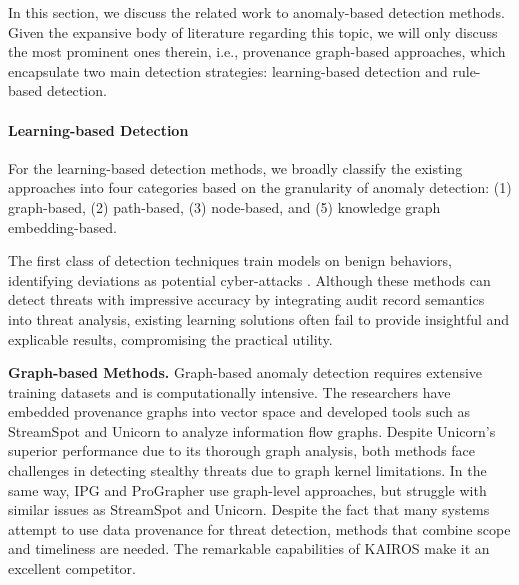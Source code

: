 

In this section, we discuss the related work to anomaly-based detection methods. Given the expansive body of literature regarding this topic, we will only discuss the most prominent ones therein, i.e., provenance graph-based approaches, which encapsulate two main detection strategies: learning-based detection and rule-based detection.


\paragraph{Learning-based Detection}
For the learning-based detection methods, we broadly classify the existing approaches into four categories based on the granularity of anomaly detection: (1) graph-based, (2) path-based, (3) node-based, and (5) knowledge graph embedding-based.

The first class of detection techniques train models on benign behaviors, identifying deviations as potential cyber-attacks . Although these methods can detect threats with impressive accuracy by integrating audit record semantics into threat analysis, existing learning solutions often fail to provide insightful and explicable results, compromising the practical utility.
% 

\noindent
{\bf Graph-based Methods.} Graph-based anomaly detection requires extensive training datasets and is computationally intensive. The researchers have embedded provenance graphs into vector space and developed tools such as StreamSpot \cite{manzoor2016fast} and Unicorn \cite{han2020unicorn} to analyze information flow graphs. Despite Unicorn's superior performance due to its thorough graph analysis, both methods face challenges in detecting stealthy threats due to graph kernel limitations. In the same way, IPG \cite{li2021hierarchical} and ProGrapher \cite{yang2023prographer} use graph-level approaches, but struggle with similar issues as StreamSpot and Unicorn. Despite the fact that many systems attempt to use data provenance for threat detection, methods that combine scope and timeliness are needed. The remarkable capabilities of KAIROS \cite{cheng2023kairos} make it an excellent competitor.

